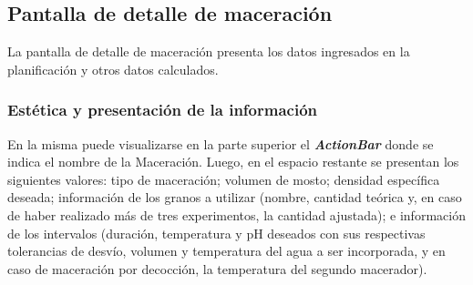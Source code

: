         \subsection{Pantalla de detalle de maceración}
        \label{DescripPantallaDetalleMaceración}
            \par La pantalla de detalle de maceración presenta los datos ingresados en la planificación y otros datos calculados.
            
            \subsubsection{Estética y presentación de la información}
            \par En la misma puede visualizarse en la parte superior el \textbf{\textit{\gls{ActionBar}}} donde se indica el nombre de la Maceración. Luego, en el espacio restante se presentan los siguientes valores: tipo de maceración; volumen de mosto; densidad específica deseada; información de los granos a utilizar (nombre, cantidad teórica y, en caso de haber realizado más de tres experimentos, la cantidad ajustada); e información de los intervalos (duración, temperatura y pH deseados con sus respectivas tolerancias de desvío, volumen y temperatura del agua a ser incorporada, y en caso de maceración por decocción, la temperatura del segundo macerador).
